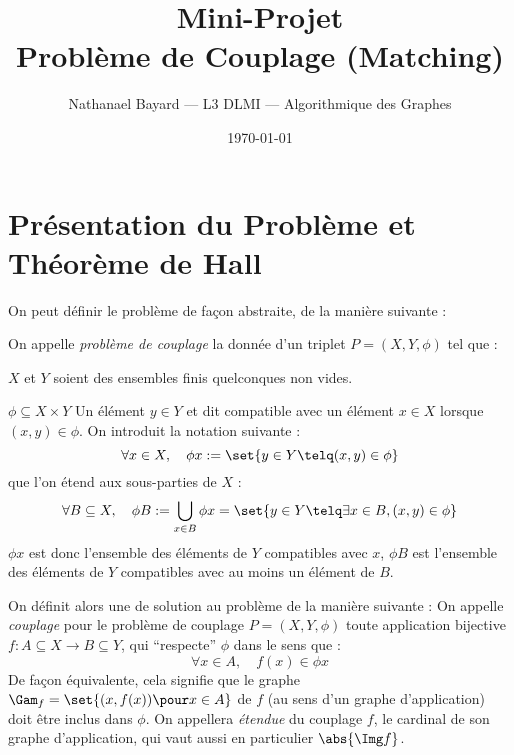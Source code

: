








\author{Nathanael Bayard --- L3 DLMI --- Algorithmique des Graphes}
\title{Mini-Projet \\ Problème de Couplage (Matching)}
\date{\today}
    
 \maketitle
\section{Présentation du Problème et Théorème de Hall}
On peut définir le problème de façon abstraite, de la manière suivante :

\SEP\jdefi On appelle \emph{problème de couplage} la donnée d'un triplet $P = (X,Y,\phi)$ tel que :
\mathL
\item $X$ et $Y$ soient des ensembles finis quelconques non vides.
\item $\phi \subseteq X \times Y$
\endL
Un élément $y \in Y$ et dit compatible avec un élément $x \in X$ lorsque $(x,y) \in \phi$. On introduit la notation suivante :
\[ \forall x \in X, \quad \phi x := \set { y \in Y \telq (x,y) \in \phi} \]
que l'on étend aux sous-parties de $X$ :
\[ \forall B \subseteq X, \quad \phi B := \bigcup_{x \in B} \phi x = \set{y \in Y \telq \exists x \in B,  (x,y) \in \phi}\]
$\phi x$ est donc l'ensemble des éléments de $Y$ compatibles avec $x$, $\phi B$ est l'ensemble des éléments de $Y$ compatibles avec au moins un élément de $B$.
\SEP

On définit alors une de solution au problème de la manière suivante :
\SEP\jdefi On appelle \emph{couplage} pour le problème de couplage $P = (X,Y,\phi)$ toute application bijective $f : A \subseteq X \to B \subseteq Y$, qui ``respecte'' $\phi$ dans le sens que :
\[ \forall x \in A, \quad f(x) \in \phi x \]
De façon équivalente, cela signifie que le graphe $\Gam_f = \set{(x,f(x)) \pour x \in A}$ de $f$ (au sens d'un graphe d'application) doit être inclus dans $\phi$. On appellera \emph{étendue} du couplage $f$, le cardinal de son graphe d'application, qui vaut aussi en particulier $\abs{\Img f}$.

